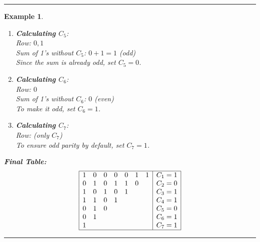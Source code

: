 \documentclass[12pt]{article}
\newtheorem{example}{Example}
\newenvironment{examp}
{\vspace{0.5cm}
 \hrule
\vspace{0.5cm}
\begin{example}}
{\hrule
\vspace{0.5cm}
\end{example}}
\begin{document}
\begin{examp}
\begin{enumerate}
		\item \textbf{Calculating \( C_5 \)}: \\ Row: \( 0, 1 \) \\ Sum of
		      1's without \( C_5 \): \( 0 + 1 = 1 \) (odd) \\ Since the sum is
		      already odd, set \( C_5 = 0 \).

		\item \textbf{Calculating \( C_6 \)}: \\ Row: \( 0 \) \\ Sum of 1's
		      without \( C_6 \): \( 0 \) (even) \\ To make it odd, set \( C_6 =
		      1 \).

		\item \textbf{Calculating \( C_7 \)}: \\ Row: (only \( C_7 \)) \\ To
		      ensure odd parity by default, set \( C_7 = 1 \). \end{enumerate}
	\textbf{Final Table:} \[ \begin{array}{|ccccccc|c|} \hline
			1 & 0 & 0 & 0 & 0 & 1 & 1 & C_1 = 1 \\
			0 & 1 & 0 & 1 & 1 & 0 &   & C_2 = 0 \\
			1 & 0 & 1 & 0 & 1 &   &   & C_3 = 1 \\
			1 & 1 & 0 & 1 &   &   &   & C_4 = 1 \\
			0 & 1 & 0 &   &   &   &   & C_5 = 0 \\
			0 & 1 &   &   &   &   &   & C_6 = 1 \\
			1 &   &   &   &   &   &   & C_7 = 1 \\ \hline\end{array} \]
\end{examp} 
\end{document}
